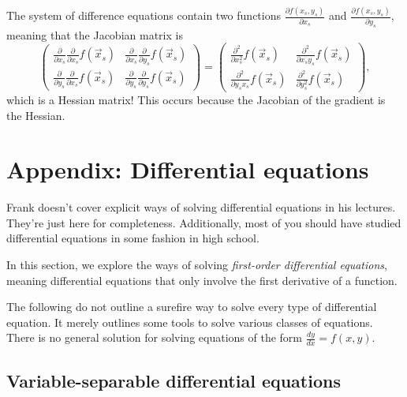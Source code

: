 \documentclass[a4paper, 12pt,oneside,openany]{book}
\begin{document}
The system of difference equations contain two functions $\frac{\partial f(x_s, y_s)}{\partial x_s}$ and $\frac{\partial f(x_s, y_s)}{\partial y_s}$, meaning that the Jacobian matrix is $$\begin{pmatrix} \frac{\partial}{\partial x_s} \frac{\partial}{\partial x_s} f(\vec{x}_s)& \frac{\partial}{\partial x_s} \frac{\partial}{\partial y_s} f(\vec{x}_s) \\ \frac{\partial}{\partial y_s} \frac{\partial}{\partial x_s} f(\vec{x}_s) & \frac{\partial}{\partial y_s} \frac{\partial}{\partial y_s} f(\vec{x}_s)\end{pmatrix} = \begin{pmatrix} \frac{\partial^2}{\partial x_s^2}  f(\vec{x}_s)& \frac{\partial^2}{\partial x_s y_s} f(\vec{x}_s) \\ \frac{\partial^2}{\partial y_sx_s} f(\vec{x}_s) & \frac{\partial^2}{\partial y_s^2} f(\vec{x}_s)\end{pmatrix}, $$ which is a Hessian matrix! This occurs because the Jacobian of the gradient is the Hessian.



\section{Appendix: Differential equations}


Frank doesn't cover explicit ways of solving differential equations in his lectures. They're just here for completeness. Additionally, most of you should have studied differential equations in some fashion in high school. 

In this section, we explore the ways of solving \emph{first-order differential equations}, meaning differential equations that only involve the first derivative of a function. 

The following do not outline a surefire way to solve every type of differential equation. It merely outlines some tools to solve various classes of equations. There is no general solution for solving equations of the form $\frac{dy}{dx}=f(x, y).$

\subsection{Variable-separable differential equations}

\end{document}
